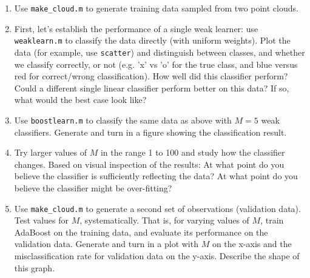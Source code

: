 \documentclass[11pt,noanswers,addpoints]{exam}
\begin{document}
\begin{enumerate}
\item  Use \texttt{make\_cloud.m} to generate training data sampled from two point clouds.

\item First, let's establish the performance of a single weak learner: use
\texttt{weaklearn.m} to classify the data directly (with uniform weights). Plot the data (for example, use \texttt{scatter}) and distinguish between classes, and whether we classify correctly, or not (e.g. 'x' vs 'o' for the true class, and blue versus red for correct/wrong classification). How well did this classifier perform?
Could a different single linear classifier perform better on this data? If so, what would the best case look like? 

\item  Use \texttt{boostlearn.m} to classify the same data as above with $M = 5$ weak classifiers.
Generate and turn in a figure showing the classification result.

\item  Try larger values of $M$ in the range 1 to 100 and study how the classifier changes. Based on visual inspection of the results:
At what point do you believe the classifier is sufficiently reflecting the data? At what point do you
believe the classifier might be over-fitting?

\item  Use \texttt{make\_cloud.m} to generate a second set of observations (validation data). Test values for $M$, systematically. That is, for varying values of $M$, train AdaBoost on the training data, and evaluate its performance on the validation data. Generate and turn in a plot with $M$ on the x-axis and the misclassification rate for validation data on
the y-axis. Describe the shape of this graph.
\end{enumerate}
\end{document}
